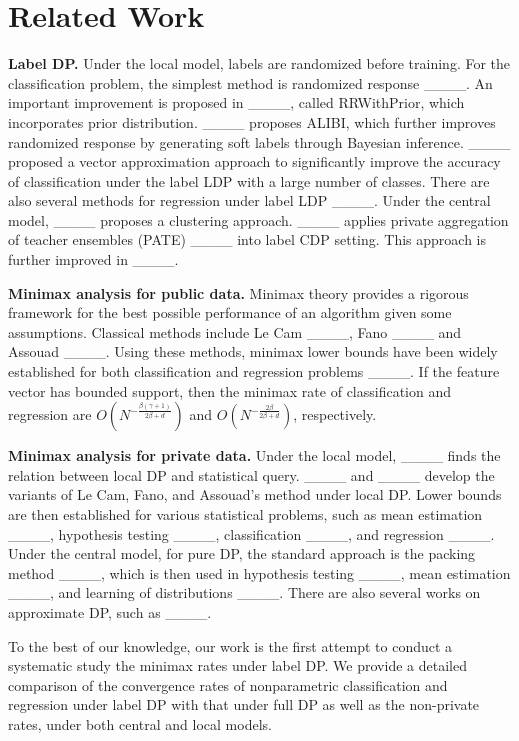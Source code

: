 \section{Related Work}
\label{sec:related}
\textbf{Label DP.} Under the local model, labels are randomized before training. For the classification problem, the simplest method is randomized response ____. An important improvement is proposed in ____, called RRWithPrior, which incorporates prior distribution. ____ proposes ALIBI, which further improves randomized response by generating soft labels through Bayesian inference. ____ proposed a vector approximation approach to significantly improve the accuracy of classification under the label LDP with a large number of classes. There are also several methods for regression under label LDP ____. Under the central model, ____ proposes a clustering approach. ____ applies private aggregation of teacher ensembles (PATE) ____ into label CDP setting. This approach is further improved in ____.

\textbf{Minimax analysis for public data.} Minimax theory provides a rigorous framework for the best possible performance of an algorithm given some assumptions. Classical methods include Le Cam ____, Fano ____ and Assouad ____. Using these methods, minimax lower bounds have been widely established for both classification and regression problems ____. If the feature vector has bounded support, then the minimax rate of classification and regression are $O(N^{-\frac{\beta(\gamma+1)}{2\beta+d}})$ and $O(N^{-\frac{2\beta}{2\beta+d}})$, respectively.

\textbf{Minimax analysis for private data.} Under the local model, ____ finds the relation between local DP and statistical query. ____ and ____ develop the variants of Le Cam, Fano, and Assouad's method under local DP. Lower bounds are then established for various statistical problems, such as mean estimation ____, hypothesis testing ____, classification ____, and regression ____. Under the central model, for pure DP, the standard approach is the packing method ____, which is then used in hypothesis testing ____, mean estimation ____, and learning of distributions ____. There are also several works on approximate DP, such as ____. 

To the best of our knowledge, our work is the first attempt to conduct a systematic study the minimax rates under label DP. We provide a detailed comparison of the convergence rates of nonparametric classification and regression under label DP with that under full DP as well as the non-private rates, under both central and local models.

